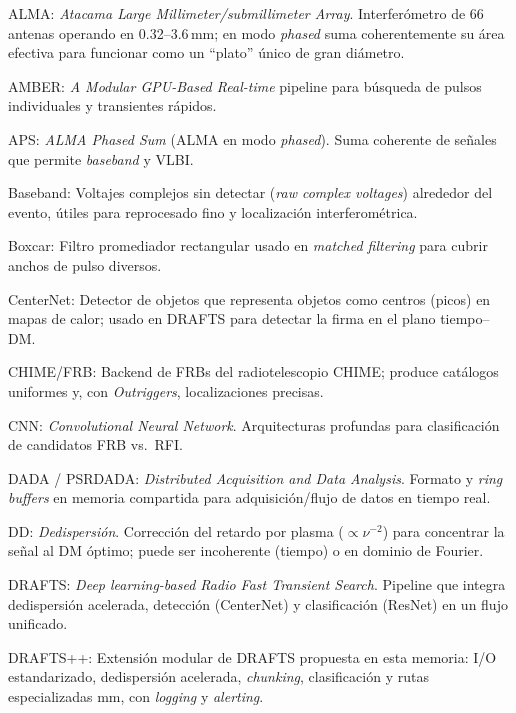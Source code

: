 
{\setlength{\parskip}{0cm} %

ALMA: \textit{Atacama Large Millimeter/submillimeter Array}. Interferómetro de 66 antenas operando en 0.32–3.6\,mm; en modo \textit{phased} suma coherentemente su área efectiva para funcionar como un “plato” único de gran diámetro. \citep{veracasanova2025}

AMBER: \textit{A Modular GPU-Based Real-time} pipeline para búsqueda de pulsos individuales y transientes rápidos. \citep{Sclocco_2020_AMBER}

APS: \textit{ALMA Phased Sum} (ALMA en modo \textit{phased}). Suma coherente de señales que permite \textit{baseband} y VLBI.

Baseband: Voltajes complejos sin detectar (\textit{raw complex voltages}) alrededor del evento, útiles para reprocesado fino y localización interferométrica.

Boxcar: Filtro promediador rectangular usado en \textit{matched filtering} para cubrir anchos de pulso diversos. \citep{Rajwade_2024_Review}

CenterNet: Detector de objetos que representa objetos como centros (picos) en mapas de calor; usado en DRAFTS para detectar la firma en el plano tiempo–DM. \citep{Zhou_2019_CenterNet}

CHIME/FRB: Backend de FRBs del radiotelescopio CHIME; produce catálogos uniformes y, con \textit{Outriggers}, localizaciones precisas. \citep{CHIMEFRB_2021_Catalog1,CHIME_Outriggers_Overview}

CNN: \textit{Convolutional Neural Network}. Arquitecturas profundas para clasificación de candidatos FRB vs.\ RFI. \citep{Agarwal_2020}

DADA / PSRDADA: \textit{Distributed Acquisition and Data Analysis}. Formato y \textit{ring buffers} en memoria compartida para adquisición/flujo de datos en tiempo real. \citep{PSRDADA_ascl,DSPSR_DADA_Header}

DD: \textit{Dedispersión}. Corrección del retardo por plasma ($\propto \nu^{-2}$) para concentrar la señal al DM óptimo; puede ser incoherente (tiempo) o en dominio de Fourier. \citep{Rajwade_2024_Review}

DRAFTS: \textit{Deep learning-based Radio Fast Transient Search}. Pipeline que integra dedispersión acelerada, detección (CenterNet) y clasificación (ResNet) en un flujo unificado. \citep{zhang2024drafts}

DRAFTS++: Extensión modular de DRAFTS propuesta en esta memoria: I/O estandarizado, dedispersión acelerada, \textit{chunking}, clasificación y rutas especializadas mm, con \textit{logging} y \textit{alerting}.

}
